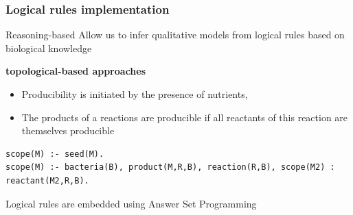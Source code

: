 \documentclass[8pt]{beamer}
\begin{document}
\begin{frame}[fragile]
\frametitle{Logical rules implementation}
\begin{exampleblock}{Reasoning-based}
Allow us to infer qualitative models from logical rules based on biological knowledge
\end{exampleblock}
\textbf{topological-based approaches}
\begin{minipage}{0.5\textwidth}
\hspace{-0.15\textwidth}
\end{minipage}%
\begin{minipage}{0.55\textwidth}
\begin{itemize}
\item Producibility is initiated by the presence of nutrients,
\item The products of a reactions are producible if all reactants of this reaction are themselves producible
\end{itemize}

\begin{lstlisting}[style=asp]
scope(M) :- seed(M).
scope(M) :- bacteria(B), product(M,R,B), reaction(R,B), scope(M2) : reactant(M2,R,B).
\end{lstlisting}
\end{minipage}

\begin{block}{}
Logical rules are embedded using Answer Set Programming  \tiny \citep{Lifschitz2008}
\end{block}
\end{frame}
\end{document}
